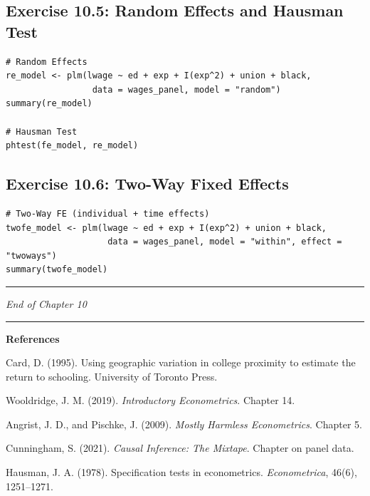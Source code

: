 \subsection{Exercise 10.5: Random Effects and Hausman Test}

\begin{lstlisting}
# Random Effects
re_model <- plm(lwage ~ ed + exp + I(exp^2) + union + black,
                 data = wages_panel, model = "random")
summary(re_model)

# Hausman Test
phtest(fe_model, re_model)
\end{lstlisting}

\subsection{Exercise 10.6: Two-Way Fixed Effects}

\begin{lstlisting}
# Two-Way FE (individual + time effects)
twofe_model <- plm(lwage ~ ed + exp + I(exp^2) + union + black,
                    data = wages_panel, model = "within", effect = "twoways")
summary(twofe_model)
\end{lstlisting}

\medskip\hrule\medskip

\textit{End of Chapter 10}

\medskip\hrule\medskip

\textbf{References}

Card, D. (1995). Using geographic variation in college proximity to estimate the return to schooling. University of Toronto Press.

Wooldridge, J. M. (2019). \textit{Introductory Econometrics}. Chapter 14.

Angrist, J. D., and Pischke, J. (2009). \textit{Mostly Harmless Econometrics}. Chapter 5.

Cunningham, S. (2021). \textit{Causal Inference: The Mixtape}. Chapter on panel data.

Hausman, J. A. (1978). Specification tests in econometrics. \textit{Econometrica}, 46(6), 1251--1271.
